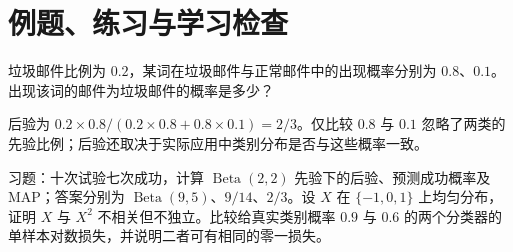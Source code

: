 \section{例题、练习与学习检查}

\begin{example}[先验会改变分类]
垃圾邮件比例为 $0.2$，某词在垃圾邮件与正常邮件中的出现概率分别为 $0.8$、$0.1$。出现该词的邮件为垃圾邮件的概率是多少？
\end{example}
\begin{solve}
后验为 $0.2\times0.8/(0.2\times0.8+0.8\times0.1)=2/3$。仅比较 $0.8$ 与 $0.1$ 忽略了两类的先验比例；后验还取决于实际应用中类别分布是否与这些概率一致。
\end{solve}

习题：十次试验七次成功，计算 $\operatorname{Beta}(2,2)$ 先验下的后验、预测成功概率及 MAP；答案分别为 $\operatorname{Beta}(9,5)$、$9/14$、$2/3$。设 $X$ 在 $\{-1,0,1\}$ 上均匀分布，证明 $X$ 与 $X^2$ 不相关但不独立。比较给真实类别概率 $0.9$ 与 $0.6$ 的两个分类器的单样本对数损失，并说明二者可有相同的零一损失。





